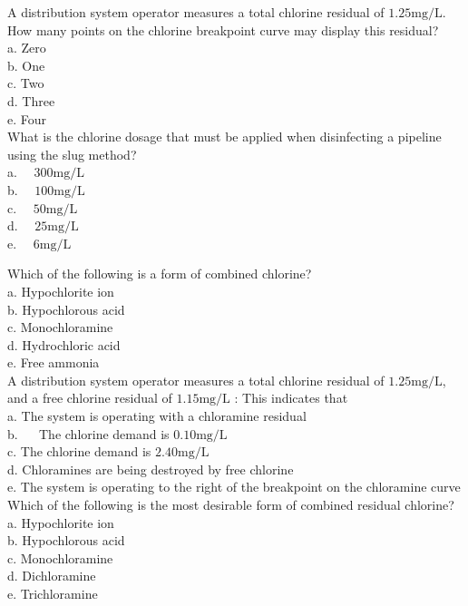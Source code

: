 A distribution system operator measures a total chlorine residual of $1.25 \mathrm{mg} / \mathrm{L}$. How many points on the chlorine breakpoint curve may display this residual?\\
a. Zero\\
b. One\\
c. Two\\
d. Three\\
e. Four\\

What is the chlorine dosage that must be applied when disinfecting a pipeline using the slug method?\\
a. $\quad 300 \mathrm{mg} / \mathrm{L}$\\
b.  $\quad 100 \mathrm{mg} / \mathrm{L}$\\
c. $\quad 50 \mathrm{mg} / \mathrm{L}$\\
d. $\quad 25 \mathrm{mg} / \mathrm{L}$\\
e. $\quad 6 \mathrm{mg} / \mathrm{L}$ 

Which of the following is a form of combined chlorine?\\
a. Hypochlorite ion\\
b. Hypochlorous acid\\
c. Monochloramine\\
d. Hydrochloric acid\\
e. Free ammonia\\

A distribution system operator measures a total chlorine residual of $1.25 \mathrm{mg} / \mathrm{L}$, and a free chlorine residual of $1.15 \mathrm{mg} / \mathrm{L}$ : This indicates that\\
a. The system is operating with a chloramine residual\\
b. $\quad$ The chlorine demand is $0.10 \mathrm{mg} / \mathrm{L}$\\
c. The chlorine demand is $2.40 \mathrm{mg} / \mathrm{L}$\\
d. Chloramines are being destroyed by free chlorine\\
e. The system is operating to the right of the breakpoint on the chloramine curve\\

Which of the following is the most desirable form of combined residual chlorine?\\
a. Hypochlorite ion\\
b. Hypochlorous acid\\
c. Monochloramine\\
d. Dichloramine\\
e. Trichloramine\\

